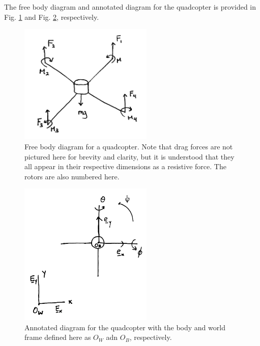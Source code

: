 \documentclass[conference]{IEEEtran}
\begin{document}
The free body diagram and annotated diagram for the quadcopter is provided in Fig. \ref{fig:fbd} and Fig. \ref{fig:quadcopter}, respectively. 
\begin{figure}[!ht]
\centering
\includegraphics[width=2.5in]{images/fbd.png}
\caption{Free body diagram for a quadcopter. Note that drag forces are not pictured here for brevity and clarity, but it is understood that they all appear in their respective dimensions as a resistive force. The rotors are also numbered here.}
\label{fig:fbd}
\end{figure}

\begin{figure}[!ht]
\centering
\includegraphics[width=2.5in]{images/quadcopter.png}
\caption{Annotated diagram for the quadcopter with the body and world frame defined here as $O_W$ adn $O_B$, respectively.}
\label{fig:quadcopter}
\end{figure}
\end{document}
